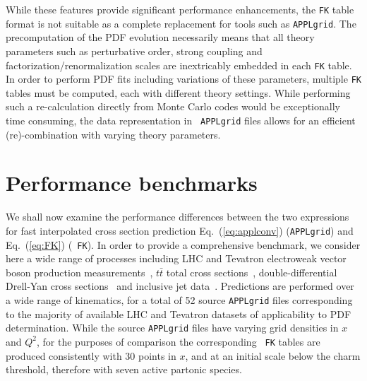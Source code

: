 \documentclass[preprint,12pt]{elsarticle}
\begin{document}
While these features provide significant performance enhancements, the
{\tt FK} table format is not suitable as a complete replacement for
tools such as {\tt APPLgrid}. The precomputation of the PDF evolution
necessarily means that all theory parameters such as perturbative
order, strong coupling and factorization/renormalization scales are
inextricably embedded in each {\tt FK} table. In order to perform PDF
fits including variations of these parameters, multiple {\tt FK}
tables must be computed, each with different theory settings. While
performing such a re-calculation directly from Monte Carlo codes would
be exceptionally time consuming, the data representation in {\tt
  APPLgrid} files allows for an efficient (re)-combination with varying
theory parameters.

\section{Performance benchmarks}
\label{sec:benchmark}

We shall now examine the performance differences between
the two expressions for fast interpolated cross section prediction
Eq.~(\ref{eq:applconv}) ({\tt APPLgrid}) and Eq.~(\ref{eq:FK}) ({\tt
  FK}).
%
In order to provide a comprehensive benchmark, we consider here a wide range of
processes including LHC and Tevatron electroweak vector boson
production
measurements~\cite{Aaij:2012mda,Aaij:2012vn,Chatrchyan:2013mza,Chatrchyan:2013uja,Chatrchyan:2012xt,Aad:2013iua,Aad:2011fp,Aad:2011dm,Aaltonen:2010zza},
$t\bar{t}$ total
cross sections~\cite{ATLAS:2012aa,ATLAS:2011xha,TheATLAScollaboration:2013dja,Chatrchyan:2013faa,Chatrchyan:2012bra,Chatrchyan:2012ria},
double-differential Drell-Yan
cross sections~\cite{Chatrchyan:2013tia,CMS:2014jea} and inclusive jet
data~\cite{Chatrchyan:2012bja,Aad:2011fc,Aad:2013lpa,Abazov:2007jy}. Predictions
are performed over a wide range of kinematics, for a total of 52
source {\tt APPLgrid} files corresponding to the majority of available
LHC and Tevatron datasets of applicability to PDF determination.
While the source {\tt APPLgrid} files have varying grid densities in
$x$ and $Q^2$, for the purposes of comparison the corresponding {\tt
  FK} tables are produced consistently with 30 points in $x$, and at
an initial scale below the charm threshold, therefore with seven
active partonic species.
\end{document}
